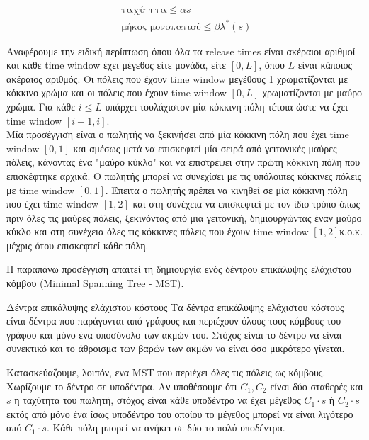 \documentclass[oneside,12pt]{book}
\theoremstyle{definition}
\begin{document}
\begin{align}
	\text{ ταχύτητα} \leq αs \\
	\text{ μήκος μονοπατιού} \leq βλ^{*}(s)
\end{align}

Αναφέρουμε την ειδική περίπτωση όπου όλα τα release times είναι ακέραιοι αριθμοί και κάθε time window έχει μέγεθος είτε μονάδα, είτε \([0,L]\), όπου \(L\) είναι κάποιος ακέραιος αριθμός. Οι πόλεις που έχουν time window μεγέθους 1 χρωματίζονται με κόκκινο χρώμα και οι πόλεις που έχουν time window \([0,L]\) χρωματίζονται με μαύρο χρώμα. Για κάθε \(i \leq L\) υπάρχει τουλάχιστον μία κόκκινη πόλη τέτοια ώστε να έχει time window \([i-1,i]\). \\

Μία προσέγγιση είναι ο πωλητής να ξεκινήσει από μία κόκκινη πόλη που έχει time window \([0,1]\) και αμέσως μετά να επισκεφτεί μία σειρά από γειτονικές μαύρες πόλεις, κάνοντας ένα "μαύρο κύκλο" και να επιστρέψει στην πρώτη κόκκινη πόλη που επισκέφτηκε αρχικά. Ο πωλητής μπορεί να συνεχίσει με τις υπόλοιπες κόκκινες πόλεις με time window \([0,1]\). Έπειτα ο πωλητής πρέπει να κινηθεί σε μία κόκκινη πόλη που έχει time window \([1,2]\) και στη συνέχεια να επισκεφτεί με τον ίδιο τρόπο όπως πριν όλες τις μαύρες πόλεις, ξεκινόντας από μια γειτονική, δημιουργώντας έναν μαύρο κύκλο και στη συνέχεια όλες τις κόκκινες πόλεις που έχουν time window \([1,2]\)κ.ο.κ. μέχρις ότου επισκεφτεί κάθε πόλη.

Η παραπάνω προσέγγιση απαιτεί τη δημιουργία ενός δέντρου επικάλυψης ελάχιστου κόμβου (Minimal Spanning Tree - MST). \\

\begin{mydefinition}{Δέντρα επικάλυψης ελάχιστου κόστους}{}
	Τα δέντρα επικάλυψης ελάχιστου κόστους είναι δέντρα που παράγονται από γράφους και περιέχουν όλους τους κόμβους του γράφου και μόνο ένα υποσύνολο των ακμών του. Στόχος είναι το δέντρο να είναι συνεκτικό και το άθροισμα των βαρών των ακμών να είναι όσο μικρότερο γίνεται.
\end{mydefinition}

Κατασκεύαζουμε, λοιπόν, ενα MST που περιέχει όλες τις πόλεις ως κόμβους. Χωρίζουμε το δέντρο σε υποδέντρα. Αν υποθέσουμε ότι \(C_1, C_2\) είναι δύο σταθερές και \(s\) η ταχύτητα του πωλητή, στόχος είναι κάθε υποδέντρο να έχει μέγεθος \(C_1 \cdot s\) ή \(C_2 \cdot s\) εκτός από μόνο ένα ίσως υποδέντρο του οποίου το μέγεθος μπορεί να είναι λιγότερο από \(C_1 \cdot s\). Κάθε πόλη μπορεί να ανήκει σε δύο το πολύ υποδέντρα. \\
\end{document}
